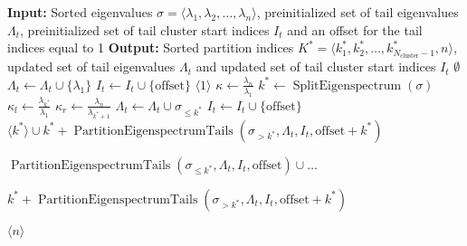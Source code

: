 \begin{algorithm}[H]
    \caption{$\operatorname{PartitionEigenspectrumTails}(\sigma, \Lambda_t\gets\emptyset, I_t\gets\emptyset, \text{offset}\gets1)$}
    \begin{algorithmic}[1]
        \State \textbf{Input:} Sorted eigenvalues $\sigma = \langle\lambda_1, \lambda_2, \ldots, \lambda_n\rangle$, preinitialized set of tail eigenvalues $\Lambda_t$, preinitialized set of tail cluster start indices $I_t$ and an offset for the tail indices equal to 1
        \State \textbf{Output:} Sorted partition indices $K^* = \langle k^*_1, k^*_2, \ldots, k^*_{N_{\text{cluster}}-1}, n\rangle$, updated set of tail eigenvalues $\Lambda_t$ and updated set of tail cluster start indices $I_t$
        \If{$\sigma = \emptyset$}
            \State \Return $\emptyset$
            \State $\Lambda_t \gets \Lambda_t \cup \{\lambda_1\}$ 
            \State $I_t \gets I_t \cup \{\text{offset}\}$
            \State \Return $\langle 1 \rangle$
        \EndIf
        \State $\kappa \gets \frac{\lambda_n}{\lambda_1}$
        \State $k^* \gets \operatorname{SplitEigenspectrum}(\sigma)$
        \State $\kappa_l \gets \frac{\lambda_{k^*}}{\lambda_1}$
        \State $\kappa_r \gets \frac{\lambda_n}{\lambda_{k^*+1}}$
            \State $\Lambda_t \gets \Lambda_t \cup \sigma_{\leq k^*}$ 
            \State $I_t \gets I_t \cup \{\text{offset}\}$
            \State \Return $\langle k^* \rangle \cup k^* + \operatorname{PartitionEigenspectrumTails}(\sigma_{>k^*}, \Lambda_t, I_t, \text{offset} + k^*)$
            \State \Return \begin{varwidth}[t]{\linewidth}
                $\operatorname{PartitionEigenspectrumTails}(\sigma_{\leq k^*}, \Lambda_t, I_t, \text{offset}) \cup \dots$\par
                $k^* + \operatorname{PartitionEigenspectrumTails}(\sigma_{>k^*}, \Lambda_t, I_t, \text{offset} + k^*)$
            \end{varwidth}
        \Else
            \State \Return $\langle n \rangle$ 
        \EndIf
    \end{algorithmic}
    \label{alg:partition_eigenspectrum_tails}
\end{algorithm}

